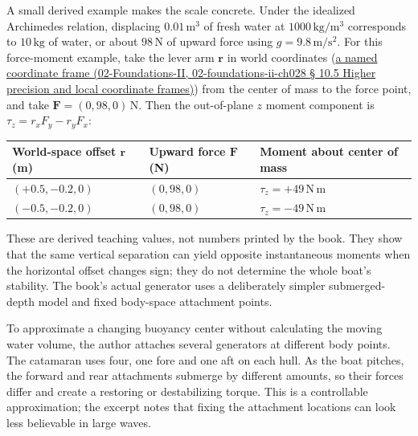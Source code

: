 A small derived example makes the scale concrete. Under the idealized Archimedes relation, displacing \(0.01\,\mathrm{m^3}\) of fresh water at \(1000\,\mathrm{kg/m^3}\) corresponds to \(10\,\mathrm{kg}\) of water, or about \(98\,\mathrm{N}\) of upward force using \(g=9.8\,\mathrm{m/s^2}\). For this force-moment example, take the lever arm \(\mathbf r\) in world coordinates (\href{}{a named coordinate frame (02-Foundations-II, 02-foundations-ii-ch028 § 10.5 Higher precision and local coordinate frames)}) from the center of mass to the force point, and take \(\mathbf F=(0,98,0)\,\mathrm{N}\). Then the out-of-plane \(z\) moment component is \(\tau_z=r_xF_y-r_yF_x\):

{\def\LTcaptype{none} %
\begin{longtable}[]{@{}
  >{\raggedright\arraybackslash}p{}
  >{\raggedright\arraybackslash}p{}
  >{\raggedright\arraybackslash}p{}@{}}
\toprule\noalign{}
\begin{minipage}[b]{\linewidth}\raggedright
World-space offset \(\mathbf r\) (m)
\end{minipage} & \begin{minipage}[b]{\linewidth}\raggedright
Upward force \(\mathbf F\) (N)
\end{minipage} & \begin{minipage}[b]{\linewidth}\raggedright
Moment about center of mass
\end{minipage} \\
\midrule\noalign{}
\endhead
\bottomrule\noalign{}
\endlastfoot
\((+0.5,-0.2,0)\) & \((0,98,0)\) & \(\tau_z=+49\,\mathrm{N\,m}\) \\
\((-0.5,-0.2,0)\) & \((0,98,0)\) & \(\tau_z=-49\,\mathrm{N\,m}\) \\
\end{longtable}
}

These are derived teaching values, not numbers printed by the book. They show that the same vertical separation can yield opposite instantaneous moments when the horizontal offset changes sign; they do not determine the whole boat's stability. The book's actual generator uses a deliberately simpler submerged-depth model and fixed body-space attachment points.

To approximate a changing buoyancy center without calculating the moving water volume, the author attaches several generators at different body points. The catamaran uses four, one fore and one aft on each hull. As the boat pitches, the forward and rear attachments submerge by different amounts, so their forces differ and create a restoring or destabilizing torque. This is a controllable approximation; the excerpt notes that fixing the attachment locations can look less believable in large waves.

